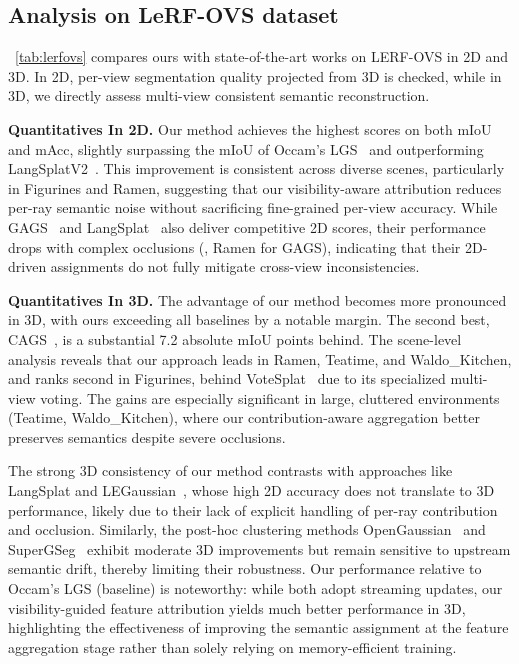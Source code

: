 \subsection{Analysis on LeRF-OVS dataset}
\tableautorefname~\ref{tab:lerfovs} compares ours with state-of-the-art works on LERF-OVS in 2D and 3D. In 2D, per-view segmentation quality projected from 3D is checked, while in 3D, we directly assess multi-view consistent semantic reconstruction.

\textbf{Quantitatives In 2D.} Our method achieves the highest scores on both mIoU and mAcc, slightly surpassing the mIoU of Occam's LGS~\cite{cheng2024occam} and outperforming LangSplatV2~\cite{li2025langsplatv2}. This improvement is consistent across diverse scenes, particularly in Figurines and Ramen, suggesting that our visibility-aware attribution reduces per-ray semantic noise without sacrificing fine-grained per-view accuracy. While GAGS~\cite{peng2024gags} and LangSplat~\cite{qin2024langsplat} also deliver competitive 2D scores, their performance drops with complex occlusions (\eg, Ramen for GAGS), indicating that their 2D-driven assignments do not fully mitigate cross-view inconsistencies.

\textbf{Quantitatives In 3D.} The advantage of our method becomes more pronounced in 3D, with ours exceeding all baselines by a notable margin. The second best, CAGS~\cite{sun2025cags}, is a substantial 7.2 absolute mIoU points behind. The scene-level analysis reveals that our approach leads in Ramen, Teatime, and Waldo\_Kitchen, and ranks second in Figurines, behind VoteSplat~\cite{jiang2025votesplat} due to its specialized multi-view voting. The gains are especially significant in large, cluttered environments (Teatime, Waldo\_Kitchen), where our contribution-aware aggregation better preserves semantics despite severe occlusions.

The strong 3D consistency of our method contrasts with approaches like LangSplat and LEGaussian~\cite{shi2024language}, whose high 2D accuracy does not translate to 3D performance, likely due to their lack of explicit handling of per-ray contribution and occlusion. Similarly, the post-hoc clustering methods OpenGaussian~\cite{wu2024opengaussian} and SuperGSeg~\cite{liang2024supergseg} exhibit moderate 3D improvements but remain sensitive to upstream semantic drift, thereby limiting their robustness. Our performance relative to Occam's LGS (baseline) is noteworthy: while both adopt streaming updates, our visibility-guided feature attribution yields much better performance in 3D, highlighting the effectiveness of improving the semantic assignment at the feature aggregation stage rather than solely relying on memory-efficient training.

